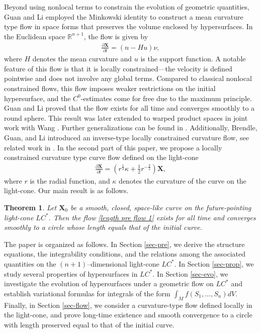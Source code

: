 \documentclass[reqno,11pt, letterpaper]{amsart}
\theoremstyle{plain}
\newtheorem{thm}{Theorem}[section]
\theoremstyle{definition}
\numberwithin{equation}{section}
\begin{document}
Beyond using nonlocal terms to constrain the evolution of geometric quantities, Guan and Li \cite{GL15} employed the Minkowski identity to construct a mean curvature type flow in space forms that preserves the volume enclosed by hypersurfaces. In the Euclidean space $\mathbb{R}^{n+1}$, the flow is given by
\begin{align*}
	\frac{\partial\mathbf{X}}{\partial t}=\left(n-Hu\right)\nu,
\end{align*}
where $H$ denotes the mean curvature and $u$ is the support function. A notable feature of this flow is that it is locally constrained—the velocity is defined pointwise and does not involve any global terms. Compared to classical nonlocal constrained flows, this flow imposes weaker restrictions on the initial hypersurface, and the $C^0$-estimates come for free due to the maximum principle. Guan and Li proved that the flow exists for all time and converges smoothly to a round sphere. This result was later extended to warped product spaces in joint work with Wang \cite{GLW19}. Further generalizations can be found in \cite{WX21}. Additionally, Brendle, Guan, and Li introduced an inverse-type locally constrained curvature flow, see related work in \cite{SX19, HLW22}. In the second part of this paper, we propose a locally constrained curvature type curve flow defined on the light-cone
\begin{align}\label{length pre flow 1}
	\frac{\partial\mathbf{X}}{\partial t}=\left(r^{\frac{1}{2}}\kappa+\frac{1}{2}r^{-\frac{3}{2}}\right)\mathbf{X},
\end{align}
where $r$ is the  radial function, and $\kappa$ denotes the curvature of the curve on the light-cone. Our main result is as follows.
\begin{thm}\label{thm behavior}
	Let $\mathbf{X}_0$ be a smooth, closed, space-like curve on the future-pointing light-cone $LC^*$. Then the flow \eqref{length pre flow 1} exists for all time and converges smoothly to a circle whose length equals that of the initial curve.
\end{thm}

The paper is organized as follows. In Section \ref{sec-pre}, we derive the structure equations, the integrability conditions, and the relations among the associated quantities on the $(n+1)$--dimensional light-cone $LC^*$. In Section \ref{sec-prop}, we study several properties of hypersurfaces in $LC^*$. In Section \ref{sec-evo}, we investigate the evolution of hypersurfaces under a geometric flow on $LC^*$ and establish variational formulas for integrals of the form $\displaystyle \int_M f(S_1,\dots,S_n)dV$. Finally, in Section \ref{sec-flow}, we consider a curvature-type flow defined locally in the light-cone, and prove long-time existence and smooth convergence to a circle with length preserved equal to that of the initial curve.
\end{document}
